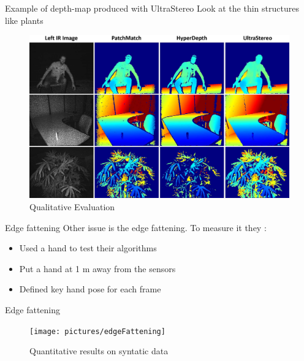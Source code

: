 \begin{frame}{Example of depth-map produced with UltraStereo}
Look at the thin structures like plants
\begin{figure}
\includegraphics[scale=0.08]{pictures/fig5}
\caption{Qualitative Evaluation}
\end{figure}
\end{frame}

\begin{frame}{Edge fattening}
Other issue is the edge fattening. To measure it they :
\begin{itemize}
\item Used a hand to test their algorithms
\item Put a hand at 1 m away from the sensors
\item Defined key hand pose for each frame
\end{itemize}
\end{frame}

\begin{frame}{Edge fattening}
\begin{figure}
\texttt{[image: pictures/edgeFattening]}
\caption{Quantitative results on syntatic data}
\end{figure}
\end{frame}


